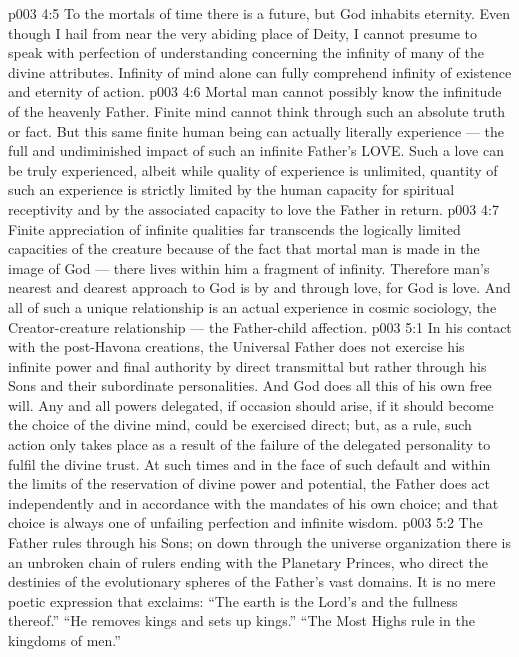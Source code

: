 \vs p003 4:5 \pc To the mortals of time there is a future, but God inhabits eternity. Even though I hail from near the very abiding place of Deity, I cannot presume to speak with perfection of understanding concerning the infinity of many of the divine attributes. Infinity of mind alone can fully comprehend infinity of existence and eternity of action.
\vs p003 4:6 \pc Mortal man cannot possibly know the infinitude of the heavenly Father. Finite mind cannot think through such an absolute truth or fact. But this same finite human being can actually  literally experience --- the full and undiminished impact of such an infinite Father’s LOVE. Such a love can be truly experienced, albeit while quality of experience is unlimited, quantity of such an experience is strictly limited by the human capacity for spiritual receptivity and by the associated capacity to love the Father in return.
\vs p003 4:7 Finite appreciation of infinite qualities far transcends the logically limited capacities of the creature because of the fact that mortal man is made in the image of God --- there lives within him a fragment of infinity. Therefore man’s nearest and dearest approach to God is by and through love, for God is love. And all of such a unique relationship is an actual experience in cosmic sociology, the Creator\hyp{}creature relationship --- the Father\hyp{}child affection.
\vs p003 5:1 In his contact with the post\hyp{}Havona creations, the Universal Father does not exercise his infinite power and final authority by direct transmittal but rather through his Sons and their subordinate personalities. And God does all this of his own free will. Any and all powers delegated, if occasion should arise, if it should become the choice of the divine mind, could be exercised direct; but, as a rule, such action only takes place as a result of the failure of the delegated personality to fulfil the divine trust. At such times and in the face of such default and within the limits of the reservation of divine power and potential, the Father does act independently and in accordance with the mandates of his own choice; and that choice is always one of unfailing perfection and infinite wisdom.
\vs p003 5:2 The Father rules through his Sons; on down through the universe organization there is an unbroken chain of rulers ending with the Planetary Princes, who direct the destinies of the evolutionary spheres of the Father’s vast domains. It is no mere poetic expression that exclaims: “The earth is the Lord’s and the fullness thereof.” “He removes kings and sets up kings.” “The Most Highs rule in the kingdoms of men.”
